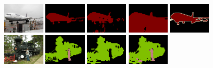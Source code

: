 \begin{figure}
  {\includegraphics[width=0.19\textwidth]{Images/analysis/0000.jpg}}
  {\includegraphics[width=0.19\textwidth]{Images/analysis/0.png}}
  {\includegraphics[width=0.19\textwidth]{Images/analysis/colored_mask_gi_val0.png}}
  {\includegraphics[width=0.19\textwidth]{Images/analysis/originalcheckpoint/0000.png}}
  {\includegraphics[width=0.19\textwidth]{Images/analysis/2007_000033.png}}
  {\includegraphics[width=0.19\textwidth]{Images/analysis/0081.jpg}}
  {\includegraphics[width=0.19\textwidth]{Images/analysis/81.png}}
  {\includegraphics[width=0.19\textwidth]{Images/analysis/colored_mask_gi_val81.png}}
  {\includegraphics[width=0.19\textwidth]{Images/analysis/originalcheckpoint/0081.png}}

\end{figure}
